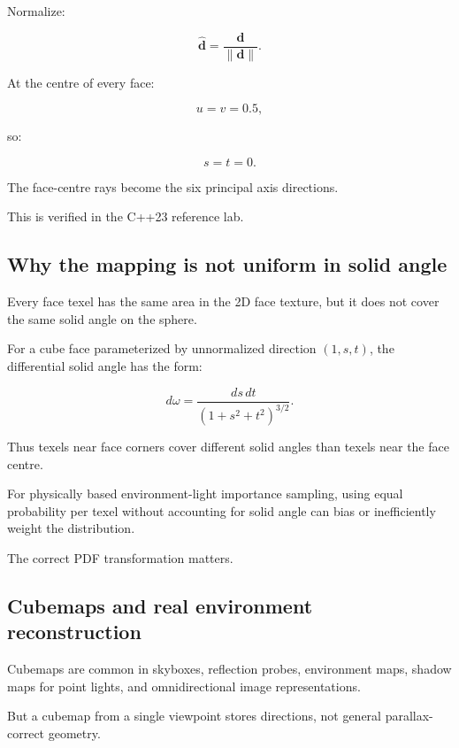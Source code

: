 Normalize:

\[ \boxed{ \hat{\mathbf d}= \frac{\mathbf d}{\|\mathbf d\|}. } \]

At the centre of every face:

\[ u=v=0.5, \]

so:

\[ s=t=0. \]

The face-centre rays become the six principal axis directions.

This is verified in the C++23 reference lab.

\subsection{Why the mapping is not uniform in solid angle}\label{02-foundations-ii-ch035-why-the-mapping-is-not-uniform-in-solid-angle}

\hypertarget{02-foundations-ii-ch035-why-the-mapping-is-not-uniform-in-solid-angle}{}

Every face texel has the same area in the 2D face texture, but it does not cover the same solid angle on the sphere.

For a cube face parameterized by unnormalized direction \((1,s,t)\), the differential solid angle has the form:

\[ \boxed{ d\omega= \frac{ds\,dt} {(1+s^2+t^2)^{3/2}}. } \]

Thus texels near face corners cover different solid angles than texels near the face centre.

For physically based environment-light importance sampling, using equal probability per texel without accounting for solid angle can bias or inefficiently weight the distribution.

The correct PDF transformation matters.

\subsection{Cubemaps and real environment reconstruction}\label{02-foundations-ii-ch035-cubemaps-and-real-environment-reconstruction}

\hypertarget{02-foundations-ii-ch035-cubemaps-and-real-environment-reconstruction}{}

Cubemaps are common in skyboxes, reflection probes, environment maps, shadow maps for point lights, and omnidirectional image representations.

But a cubemap from a single viewpoint stores directions, not general parallax-correct geometry.

